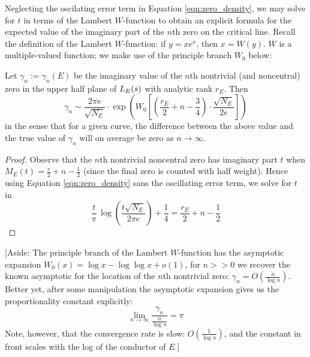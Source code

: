 Neglecting the oscilating error term in Equation \ref{eqn:zero_density}, we may solve for $t$ in terms of the Lambert $W$-function to obtain an explicit formula for the expected value of the imaginary part of the $n$th zero on the critical line. Recall the definition of the Lambert $W$-function: if $y = x e^x$, then $x = W(y)$. $W$ is a multiple-valued function; we make use of the principle branch $W_0$ below:
\begin{corollary}\label{cor:gamma_n_approx_value}
Let $\gamma_n := \gamma_n(E)$ be the imaginary value of the $n$th nontrivial (and noncentral) zero in the upper half plane of $L_E(s)$ with analytic rank $r_E$. Then
\begin{equation}\label{approx:gamma_n}
\gamma_n \sim \frac{2\pi e}{\sqrt{N_E}} \cdot \exp \left(W_0\left[\left(\frac{r_E}{2} +n - \frac{3}{4}\right)\cdot \frac{\sqrt{N_E}}{2 e}\right]\right)
\end{equation}
in the sense that for a given curve, the difference between the above value and the true value of $\gamma_n$ will on average be zero as $n \to \infty$.
\end{corollary}
\begin{proof}
Observe that the $n$th nontrivial noncentral zero has imaginary part $t$ when $M_E(t) = \frac{r}{2} + n - \frac{1}{2}$ (since the final zero is counted with half weight). Hence using Equation \ref{eqn:zero_density} sans the oscillating error term, we solve for $t$ in
\begin{equation*}
\frac{t}{\pi} \, \log\left(\frac{t\sqrt{N_E}}{2\pi e}\right) + \frac{1}{4} = \frac{r_E}{2} + n - \frac{1}{2}
\end{equation*}
\end{proof}

[Aside: The principle branch of the Lambert $W$-function has the asymptotic expansion $W_0(x) = \log x - \log \log x + o\left(1\right)$, for $n >> 0$ we recover the known asymptotic for the location of the $n$th nontrivial zero: $\gamma_n = O\left(\frac{n}{\log n} \right)$. Better yet, after some manipulation the asymptotic expansion gives us the proportionality constant explicitly:
\begin{equation}
\lim_{n \to \infty} \frac{\gamma_n}{\frac{n}{\log n}} = \pi
\end{equation}
Note, however, that the convergence rate is slow: $O(\frac{1}{\log n})$, and the constant in front scales with the log of the conductor of $E$.] \\

